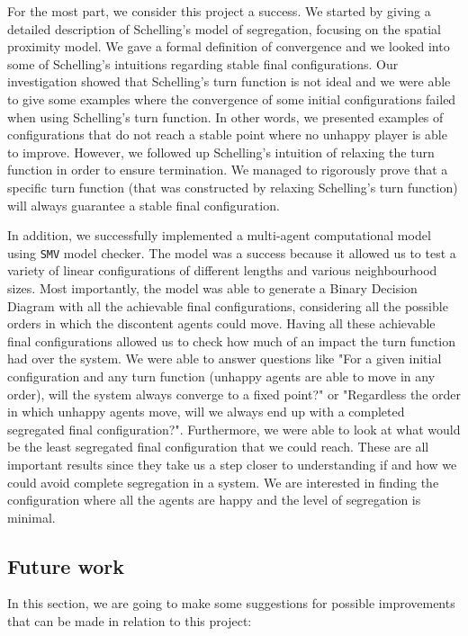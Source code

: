 \documentclass[../main.tex]{subfiles}
\begin{document}
For the most part, we consider this project a success. We started by giving a detailed description of Schelling's model of segregation, focusing on the spatial proximity model. We gave a formal definition of convergence and we looked into some of Schelling's intuitions regarding stable final configurations. Our investigation showed that Schelling's turn function is not ideal and we were able to give some examples where the convergence of some initial configurations failed when using Schelling's turn function. In other words, we presented examples of  configurations that do not reach a stable point where no unhappy player is able to improve. However, we followed up Schelling's intuition of relaxing the turn function in order to ensure termination. We managed to rigorously prove that a specific turn function (that was constructed by relaxing Schelling's turn function) will always guarantee a stable final configuration. 

In addition, we successfully implemented a multi-agent computational model using \verb|SMV| model checker. The model was a success because it allowed us to test a variety of linear configurations of different lengths and various neighbourhood sizes. Most importantly, the model was able to generate a Binary Decision Diagram with all the achievable final configurations, considering all the possible orders in which the discontent agents could move. Having all these achievable final configurations allowed us to check how much of an impact the turn function had over the system. We were able to answer questions like "For a given initial configuration and any turn function (unhappy agents are able to move in any order), will the system always converge to a fixed point?" or "Regardless the order in which unhappy agents move, will we always end up with a completed segregated final configuration?". Furthermore, we were able to look at what would be the least segregated final configuration that we could reach. These are all important results since they take us a step closer to understanding if and how we could avoid complete segregation in a system. We are interested in finding the configuration where all the agents are happy and the level of segregation is minimal. 



\subsection{Future work}
In this section, we are going to make some suggestions for possible improvements that can be made in relation to this project:
\end{document}
